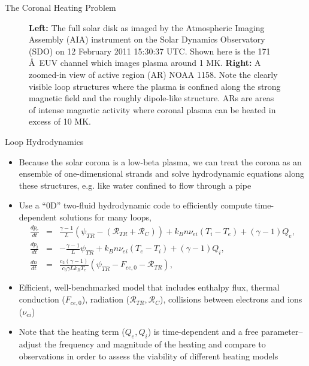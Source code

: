 \documentclass[final]{beamer}
\newcommand{\ang}{\AA~} %
\begin{document}
\begin{frame}
\begin{columns}[T]
\begin{column}{0.49\linewidth}
\begin{block}{The Coronal Heating Problem}
\begin{figure}
\begin{columns}
                \caption{\textbf{Left:} The full solar disk as imaged by the Atmospheric Imaging Assembly (AIA) instrument on the Solar Dynamics Observatory (SDO) on 12 February 2011 15:30:37 UTC. Shown here is the 171 \ang EUV channel which images plasma around 1 MK. \textbf{Right:} A zoomed-in view of active region (AR) NOAA 1158. Note the clearly visible loop structures where the plasma is confined along the strong magnetic field and the roughly dipole-like structure. ARs are areas of intense magnetic activity where coronal plasma can be heated in excess of 10 MK.}
            \end{columns}
        \end{figure}
    \end{block}
    \begin{block}{Loop Hydrodynamics}
    \begin{itemize}
        \item Because the solar corona is a \alert{low-beta} plasma, we can treat the corona as an ensemble of one-dimensional strands and solve hydrodynamic equations along these structures, e.g. like water confined to flow through a pipe 
        \item Use a ``0D'' two-fluid hydrodynamic code \citep{klimchuk_highly_2008,cargill_enthalpy-based_2012,barnes_inference_2016} to efficiently compute time-dependent solutions for \alert{many} loops,
        \begin{eqnarray}
            \frac{dp_e}{dt} &=& \frac{\gamma - 1}{L}(\psi_{TR} - (\mathcal{R}_{TR} + \mathcal{R}_C)) + k_Bn\nu_{ei}(T_i - T_e) + (\gamma - 1)Q_e, \\
            \frac{dp_i}{dt} &=& -\frac{\gamma - 1}{L}\psi_{TR} + k_Bn\nu_{ei}(T_e - T_i) + (\gamma - 1)Q_i, \\
            \frac{dn}{dt} &=& \frac{c_2(\gamma - 1)}{c_3\gamma Lk_BT_e}(\psi_{TR} - F_{ce,0} - \mathcal{R}_{TR}),
        \end{eqnarray}
        \item Efficient, well-benchmarked model \citep[see][]{cargill_enthalpy-based_2012-1,barnes_inference_2016} that includes enthalpy flux, thermal conduction ($F_{ce,0}$), radiation ($\mathcal{R}_{TR},\mathcal{R}_C$), collisions between electrons and ions ($\nu_{ei}$)
        \item Note that the heating term ($Q_e,Q_i$) is time-dependent and a \alert{free parameter}--adjust the frequency and magnitude of the heating and compare to observations in order to assess the viability of different heating models

\end{itemize}
\end{block}
\end{column}
\end{columns}
\end{frame}
\end{document}
